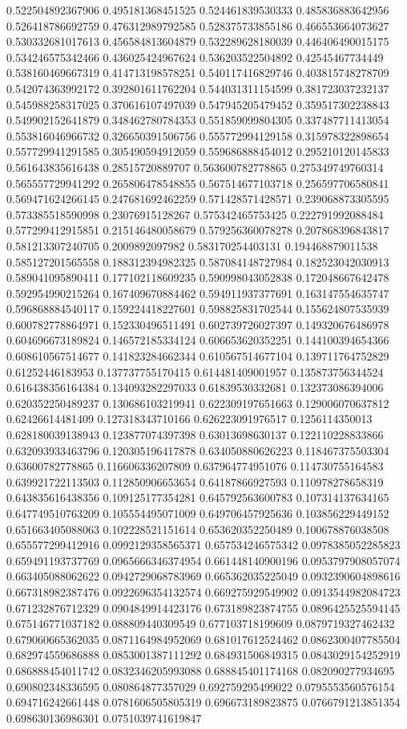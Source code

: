 \begin{table}
\begin{tabu}
\begin{sparkline}{10}
0.522504892367906 0.495181368451525 0.524461839530333 0.485836883642956 0.526418786692759 0.476312989792585 0.528375733855186 0.466553664073627 0.530332681017613 0.456584813604879 0.532289628180039 0.446406490015175 0.534246575342466 0.436025424967624 0.536203522504892 0.42545467734449 0.538160469667319 0.414713198578251 0.540117416829746 0.403815748278709 0.542074363992172 0.392801611762204 0.544031311154599 0.381723037232137 0.545988258317025 0.370616107497039 0.547945205479452 0.359517302238843 0.549902152641879 0.348462780784353 0.551859099804305 0.337487711413054 0.553816046966732 0.326650391506756 0.555772994129158 0.315978322898654 0.557729941291585 0.305490594912059 0.559686888454012 0.295210120145833 0.561643835616438 0.28515720889707 0.563600782778865 0.275349749760314 0.565557729941292 0.265806478548855 0.567514677103718 0.256597706580841 0.569471624266145 0.247681692462259 0.571428571428571 0.239068873305595 0.573385518590998 0.23076915128267 0.575342465753425 0.222791992088484 0.577299412915851 0.215146480058679 0.579256360078278 0.207868396843817 0.581213307240705 0.2009892097982 0.583170254403131 0.194468879011538 0.585127201565558 0.188312394982325 0.587084148727984 0.182523042030913 0.589041095890411 0.177102118609235 0.590998043052838 0.172048667642478 0.592954990215264 0.167409670884462 0.594911937377691 0.163147554635747 0.596868884540117 0.159224418227601 0.598825831702544 0.155624807535939 0.600782778864971 0.152330496511491 0.602739726027397 0.149320676486978 0.604696673189824 0.146572185334124 0.606653620352251 0.144100394654366 0.608610567514677 0.141823284662344 0.610567514677104 0.139711764752829 0.61252446183953 0.137737755170415 0.614481409001957 0.135873756344524 0.616438356164384 0.134093282297033 0.61839530332681 0.132373086394006 0.620352250489237 0.130686103219941 0.622309197651663 0.129006070637812 0.62426614481409 0.127318343710166 0.626223091976517 0.1256114350013 0.628180039138943 0.123877074397398 0.63013698630137 0.122110228833866 0.632093933463796 0.120305196417878 0.634050880626223 0.118467375503304 0.63600782778865 0.116606336207809 0.637964774951076 0.114730755164583 0.639921722113503 0.112850906653654 0.64187866927593 0.110978278658319 0.643835616438356 0.109125177354281 0.645792563600783 0.107314137634165 0.647749510763209 0.105554495071009 0.649706457925636 0.103856229449152 0.651663405088063 0.102228521151614 0.653620352250489 0.100678876038508 0.655577299412916 0.0992129358565371 0.657534246575342 0.0978385052285823 0.659491193737769 0.0965666346374954 0.661448140900196 0.0953797908057074 0.663405088062622 0.0942729068783969 0.665362035225049 0.0932390604898616 0.667318982387476 0.0922696354132574 0.669275929549902 0.0913544982084723 0.671232876712329 0.0904849914423176 0.673189823874755 0.0896425525594145 0.675146771037182 0.088809440309549 0.677103718199609 0.0879719327462432 0.679060665362035 0.0871164984952069 0.681017612524462 0.0862300407785504 0.682974559686888 0.0853001387111292 0.684931506849315 0.0843029154252919 0.686888454011742 0.0832346205993088 0.688845401174168 0.082090277934695 0.690802348336595 0.080864877357029 0.692759295499022 0.0795553560576154 0.694716242661448 0.0781606505805319 0.696673189823875 0.0766791213851354 0.698630136986301 0.0751039741619847 
\end{sparkline}
\end{tabu}
\end{table}
